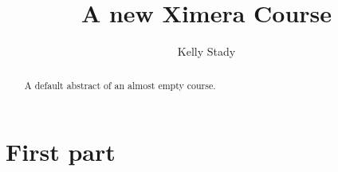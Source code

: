 \documentclass{xourse}
\title{A new Ximera Course}
\author{Kelly Stady}
\begin{document}
\begin{abstract}
    A default abstract of an almost empty course.
\end{abstract}
\maketitle

\part{First part}

\end{document}

